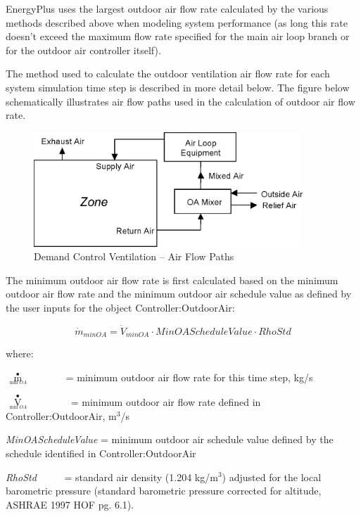 EnergyPlus uses the largest outdoor air flow rate calculated by the various methods described above when modeling system performance (as long this rate doesn't exceed the maximum flow rate specified for the main air loop branch or for the outdoor air controller itself).

The method used to calculate the outdoor ventilation air flow rate for each system simulation time step is described in more detail below. The figure below schematically illustrates air flow paths used in the calculation of outdoor air flow rate.

\begin{figure}[hbtp] %
\centering
\includegraphics[width=0.9\textwidth, height=0.9\textheight, keepaspectratio=true]{media/image4731.png}
\caption{Demand Control Ventilation -- Air Flow Paths \protect \label{fig:demand-control-ventilation-air-flow-paths}}
\end{figure}

The minimum outdoor air flow rate is first calculated based on the minimum outdoor air flow rate and the minimum outdoor air schedule value as defined by the user inputs for the object Controller:OutdoorAir:

\begin{equation}
\dot{m}_{minOA} = \dot{V}_{minOA} \cdot MinOAScheduleValue \cdot RhoStd
\end{equation}

where:

\({\mathop m\limits^ \bullet_{_{\min OA}}}\) ~~~~~~ = minimum outdoor air flow rate for this time step, kg/s

\({\mathop V\limits^ \bullet_{_{\min OA}}}\) ~~~~~~~ = minimum outdoor air flow rate defined in Controller:OutdoorAir, m\(^{3}\)/s

\emph{MinOAScheduleValue} = minimum outdoor air schedule value defined by the schedule identified in Controller:OutdoorAir

\emph{RhoStd}~~~~~ = standard air density (1.204 kg/m\(^{3}\)) adjusted for the local barometric pressure (standard barometric pressure corrected for altitude, ASHRAE 1997 HOF pg. 6.1).

